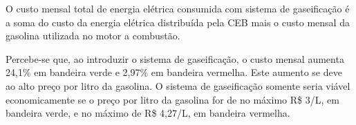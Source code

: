 O custo mensal total de energia elétrica consumida com sistema de gaseificação é a soma do custo da energia elétrica distribuída pela CEB mais o custo mensal da gasolina utilizada no motor a combustão.

Percebe-se que, ao introduzir o sistema de gaseificação, o custo mensal aumenta 24,1\% em bandeira verde e 2,97\% em bandeira vermelha. Este aumento se deve ao alto preço por litro da gasolina. O sistema de gaseificação somente seria viável economicamente se o preço por litro da gasolina for de no máximo R\$ 3/L, em bandeira verde, e no máximo de R\$ 4,27/L, em bandeira vermelha.